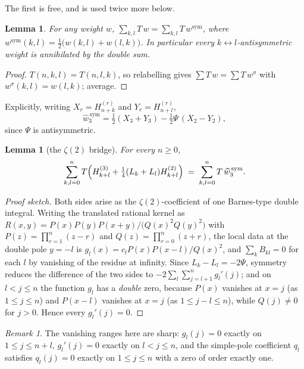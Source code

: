 \documentclass[11pt,a4paper]{amsart}
\theoremstyle{plain}
\newtheorem{lemma}[theorem]{Lemma}
\theoremstyle{definition}
\theoremstyle{remark}
\newtheorem{remark}[theorem]{Remark}
\newcommand{\T}{T}
\begin{document}
The first is free, and is used twice more below.

\begin{lemma}\label{lem:sym}
For any weight $w$, $\sum_{k,l}\T\,w=\sum_{k,l}\T\,w^{\mathrm{sym}}$, where
$w^{\mathrm{sym}}(k,l)=\frac12\bigl(w(k,l)+w(l,k)\bigr)$. In particular every
$k\leftrightarrow l$-antisymmetric weight is annihilated by the double sum.
\end{lemma}

\begin{proof}
$\T(n,k,l)=\T(n,l,k)$, so relabelling gives $\sum\T\,w=\sum\T\,w^{\sigma}$ with
$w^\sigma(k,l)=w(l,k)$; average.
\end{proof}

Explicitly, writing $X_r=H^{(r)}_{n+k}$ and $Y_r=H^{(r)}_{n+l}$,
\begin{equation}\label{eq:w3sym}
  \widehat w_3^{\,\mathrm{sym}}=\tfrac12(X_3+Y_3)-\tfrac12\Psi\,(X_2-Y_2),
\end{equation}
since $\Psi$ is antisymmetric.

\begin{lemma}[the $\zeta(2)$ bridge]\label{lem:bridge}
For every $n\ge0$,
\[
  \sum_{k,l=0}^{n}\T\Bigl(H^{(3)}_{k+l}+\tfrac14(L_k+L_l)H^{(2)}_{k+l}\Bigr)
  \;=\;\sum_{k,l=0}^{n}\T\,\widehat w_3^{\,\mathrm{sym}}.
\]
\end{lemma}

\begin{proof}[Proof sketch]
Both sides arise as the $\zeta(2)$-coefficient of one Barnes-type double integral. Writing the
translated rational kernel as
$R(x,y)=P(x)P(y)P(x+y)/\bigl(Q(x)^2Q(y)^2\bigr)$ with $P(z)=\prod_{r=1}^n(z-r)$ and
$Q(z)=\prod_{r=0}^n(z+r)$, the local data at the double pole $y=-l$ is
$g_l(x)=c_lP(x)P(x-l)/Q(x)^2$, and $\sum_kB_{kl}=0$ for each $l$ by vanishing of the residue at
infinity. Since $L_k-L_l=-2\Psi$, symmetry reduces the difference of the two sides to
$-2\sum_l\sum_{j=l+1}^{n}g_l'(j)$; and on $l<j\le n$ the function $g_l$ has a \emph{double} zero,
because $P(x)$ vanishes at $x=j$ (as $1\le j\le n$) and $P(x-l)$ vanishes at $x=j$ (as
$1\le j-l\le n$), while $Q(j)\neq0$ for $j>0$. Hence every $g_l'(j)=0$.
\end{proof}

\begin{remark}
The vanishing ranges here are sharp: $g_l(j)=0$ exactly on $1\le j\le n+l$, $g_l'(j)=0$ exactly
on $l<j\le n$, and the simple-pole coefficient $q_l$ satisfies $q_l(j)=0$ exactly on
$1\le j\le n$ with a zero of order exactly one.
\end{remark}
\end{document}
